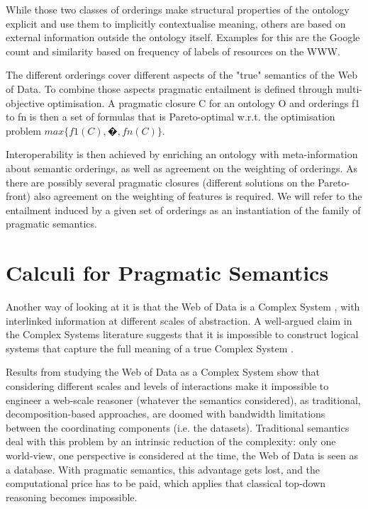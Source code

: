 \documentclass[letterpaper]{article}
\begin{document}
While those two classes of orderings make structural properties of the ontology explicit and use them to implicitly contextualise meaning, others are based on external information outside the ontology itself. Examples for this are the Google count and similarity \cite{cilibrasi} based on frequency of labels of resources on the WWW.

The different orderings cover different aspects of the "true" semantics of the Web of Data. To combine those aspects pragmatic entailment is defined through multi-objective optimisation. A pragmatic closure C for an ontology O and orderings f1 to fn is then a set of formulas that is Pareto-optimal \cite{pareto} w.r.t. the optimisation problem $max\{f1 (C),�,fn (C)\}$.

Interoperability is then achieved by enriching an ontology with meta-information about semantic orderings, as well as agreement on the weighting of orderings. As there are possibly several pragmatic closures (different solutions on the Pareto-front) also agreement on the weighting of features is required. We will refer to the entailment induced by a given set of orderings as an instantiation of the family of pragmatic semantics.

\section{Calculi for Pragmatic Semantics}

Another way of looking at it is that the Web of Data is a Complex System \cite{gueretACS2011}, with interlinked information at different scales of abstraction. A well-argued claim in the Complex Systems literature suggests that it is impossible to construct logical systems that capture the full meaning of a true Complex System \cite{bar-yam}.

Results from studying the Web of Data as a Complex System show that considering different scales and levels of interactions make it impossible to engineer a web-scale reasoner (whatever the semantics considered), as traditional, decomposition-based approaches, are doomed with bandwidth limitations between the coordinating components (i.e. the datasets). Traditional semantics deal with this problem by an intrinsic reduction of the complexity: only one world-view, one perspective is considered at the time, the Web of Data is seen as a database. With pragmatic semantics, this advantage gets lost, and the computational price has to be paid, which applies that classical top-down reasoning becomes impossible.
\end{document}
